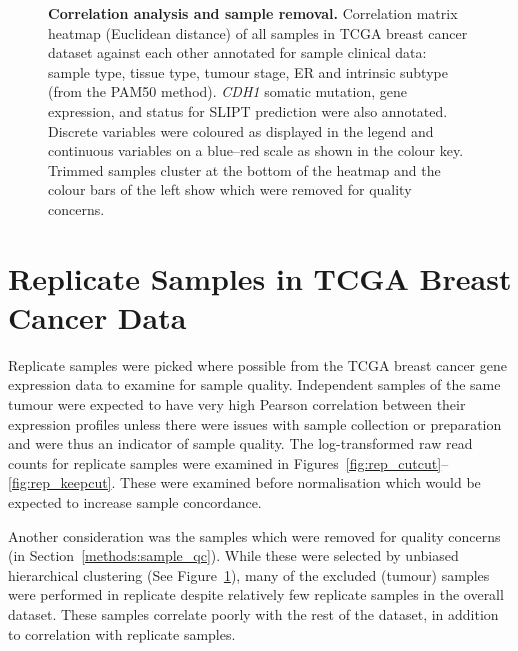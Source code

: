 \begin{figure}[!ht]
  \begin{center}
   \end{center}
   \caption[Correlation analysis and sample removal]{\small \textbf{Correlation analysis and sample removal.} Correlation matrix heatmap (Euclidean distance) of all samples in \gls{TCGA} breast cancer dataset against each other annotated for sample clinical data: sample type, tissue type, tumour stage, \gls{ER} and intrinsic subtype (from the \acrshort{PAM50} method). \textit{CDH1} somatic mutation, gene expression, and status for \gls{SLIPT} prediction were also annotated. Discrete variables were coloured as displayed in the legend and continuous variables on a blue--red scale as shown in the colour key. Trimmed samples cluster at the bottom of the heatmap and the colour bars of the left show which were removed for quality concerns.}
\label{fig:corr_map}
\end{figure}

\clearpage

\section{Replicate Samples in TCGA Breast Cancer Data}
\label{appendix:replicate_samples}

Replicate samples were picked where possible from the \gls{TCGA} breast cancer gene expression data to examine for sample quality. Independent samples of the same tumour were expected to have very high Pearson correlation between their expression profiles unless there were issues with sample collection or preparation and were thus an indicator of sample quality. The log-transformed raw read counts for replicate samples were examined in Figures~\ref{fig:rep_cutcut}\nobreakdash--\ref{fig:rep_keepcut}. These were examined before normalisation which would be expected to increase sample concordance.

Another consideration was the samples which were removed for quality concerns (in Section~\ref{methods:sample_qc}). While these were selected by unbiased hierarchical clustering (See Figure~\ref{fig:corr_map}), many of the excluded (tumour) samples were performed in replicate despite relatively few replicate samples in the overall dataset. These samples correlate poorly with the rest of the dataset, in addition to correlation with replicate samples.

